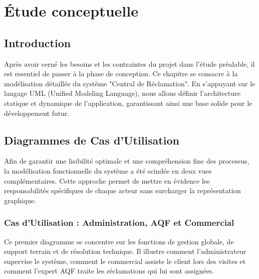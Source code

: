 \chapter{Étude conceptuelle}

\section*{Introduction}
Après avoir cerné les besoins et les contraintes du projet dans l'étude préalable, il est essentiel de passer à la phase de conception. Ce chapitre se consacre à la modélisation détaillée du système "Central de Réclamation". En s'appuyant sur le langage UML (Unified Modeling Language), nous allons définir l'architecture statique et dynamique de l'application, garantissant ainsi une base solide pour le développement futur.

\section{Diagrammes de Cas d'Utilisation}
Afin de garantir une lisibilité optimale et une compréhension fine des processus, la modélisation fonctionnelle du système a été scindée en deux vues complémentaires. Cette approche permet de mettre en évidence les responsabilités spécifiques de chaque acteur sans surcharger la représentation graphique.

\subsection{Cas d'Utilisation : Administration, AQF et Commercial}
Ce premier diagramme se concentre sur les fonctions de gestion globale, de support terrain et de résolution technique. Il illustre comment l'administrateur supervise le système, comment le commercial assiste le client lors des visites et comment l'expert AQF traite les réclamations qui lui sont assignées.

